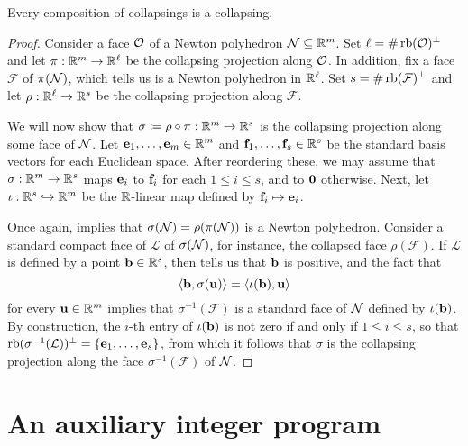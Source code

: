 \documentclass{amsart}
\begin{document}

\begin{proposition}
\label{collapse of a collapse is a collapse: P} Every composition of collapsings is a collapsing.
\end{proposition}

\begin{proof}
Consider a face $\mathcal{O}$ of a Newton polyhedron $\mathcal{N} \subseteq \mathbb{R}^m$.   Set $\ell = \# \operatorname{rb}(\mathcal{O})^{\perp}$ and let $\pi: \mathbb{R}^m \to \mathbb{R}^{\ell}$ be the collapsing projection along $\mathcal{O}$.  In addition, fix a face $\mathcal{F}$ of $\pi(\mathcal{N})$,  which  tells us is a Newton polyhedron in $\mathbb{R}^{\ell}$.  Set $s=\# \operatorname{rb}(\mathcal{F})^{\perp}$ and let $\rho: \mathbb{R}^{\ell} \to \mathbb{R}^s$ be the collapsing projection along $\mathcal{F}$.

We will now show that $\sigma \coloneqq \rho \circ \pi: \mathbb{R}^m \to \mathbb{R}^s$ is the collapsing projection along some face of $\mathcal{N}$.  Let $\mathbf{e}_1, \ldots, \mathbf{e}_m \in \mathbb{R}^m$ and $\mathbf{f}_1, \ldots, \mathbf{f}_s \in \mathbb{R}^s$ be the standard basis vectors for each Euclidean space.  After reordering these, we may assume that $\sigma: \mathbb{R}^m \to \mathbb{R}^s$ maps $\mathbf{e}_i$ to $\mathbf{f}_i$ for each $1 \leq i \leq s$, and to $\mathbf{0}$ otherwise.   Next, let  $\iota:  \mathbb{R}^s \hookrightarrow \mathbb{R}^m$ be the $\mathbb{R}$-linear map defined by $\mathbf{f}_i \mapsto \mathbf{e}_i$.

Once again,  implies that $\sigma(\mathcal{N}) = \rho(\pi(\mathcal{N}))$ is a Newton polyhedron.  Consider a standard compact face of $\mathcal{L}$ of $\sigma(\mathcal{N})$, for instance, the collapsed face $\rho(\mathcal{F})$.    If $\mathcal{L}$ is defined by a point $\mathbf{b} \in \mathbb{R}^s$, then   tells us that $\mathbf{b}$ is positive, and the fact that
\[ \langle \mathbf{b}, \sigma(\mathbf{u}) \rangle = \langle \iota(\mathbf{b}), \mathbf{u} \rangle \] for every $\mathbf{u} \in \mathbb{R}^m$ implies that $\sigma^{-1}(\mathcal{F})$ is a standard face of $\mathcal{N}$ defined by $\iota(\mathbf{b})$.  By construction, the $i$-th entry of $\iota(\mathbf{b})$ is not zero if and only if $1 \leq i \leq s$, so that $\operatorname{rb}(\sigma^{-1}(\mathcal{L}))^{\perp} = \{ \mathbf{e}_1, \ldots, \mathbf{e}_s \}$, from which it follows that $\sigma$ is the collapsing projection along the face $\sigma^{-1}(\mathcal{F})$ of $\mathcal{N}$.
\end{proof}

\section{An auxiliary integer program}
\end{document}
